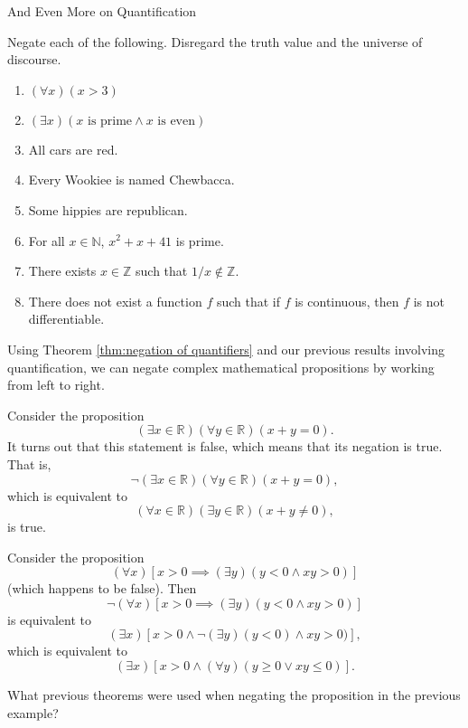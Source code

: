 \begin{section}{And Even More on Quantification}
\begin{exercise}
Negate each of the following.  Disregard the truth value and the universe of discourse.
\begin{enumerate}
\item $(\forall x)(x>3)$
\item $(\exists x)(x \mbox{ is prime}\wedge x \mbox{ is even})$
\item All cars are red.
\item Every Wookiee is named Chewbacca.
\item Some hippies are republican.
\item For all $x\in\mathbb{N}$, $x^2+x+41$ is prime.
\item There exists $x\in\mathbb{Z}$ such that $1/x\notin\mathbb{Z}$.
\item There does not exist a function $f$ such that if $f$ is continuous, then $f$ is not differentiable.
\end{enumerate}
\end{exercise}

Using Theorem \ref{thm:negation of quantifiers} and our previous results involving quantification, we can negate complex mathematical propositions by working from left to right.

\begin{example}
Consider the proposition
\[
(\exists x\in\mathbb{R})(\forall y\in\mathbb{R})(x+y=0).
\]
It turns out that this statement is false, which means that its negation is true.  That is,
\[
\neg(\exists x\in\mathbb{R})(\forall y\in\mathbb{R})(x+y=0),
\]
which is equivalent to
\[
(\forall x\in\mathbb{R})(\exists y\in\mathbb{R})(x+y\neq 0),
\]
is true.
\end{example}

\begin{example}
Consider the proposition
\[
(\forall x)[x>0\implies (\exists y)(y<0 \wedge xy>0)]
\]
(which happens to be false).  Then
\[
\neg (\forall x)[x>0\implies (\exists y)(y<0 \wedge xy>0)]
\]
is equivalent to
\[
(\exists x)[x>0 \wedge \neg (\exists y)(y<0) \wedge xy>0)],
\]
which is equivalent to 
\[
(\exists x)[x>0 \wedge (\forall y)(y\geq 0 \vee xy\leq 0)].
\]
\end{example}

\begin{exercise}
What previous theorems were used when negating the proposition in the previous example?
\end{exercise}


\end{section}
